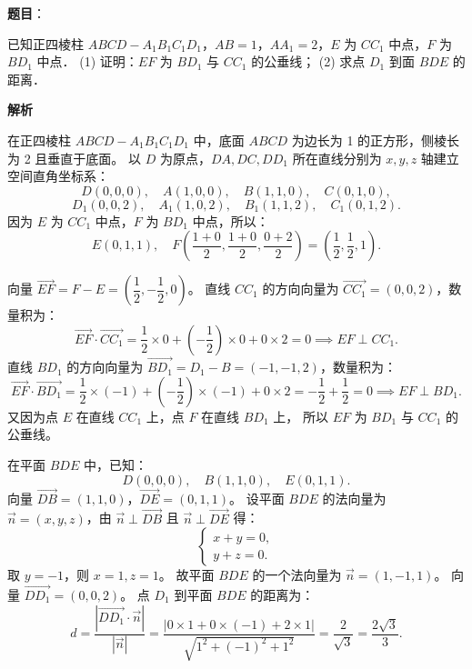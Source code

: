 \begin{answer}

\textbf{题目}：

已知正四棱柱 $ABCD - A_1B_1C_1D_1$，$AB = 1$，$AA_1 = 2$，$E$ 为 $CC_1$ 中点，$F$ 为 $BD_1$ 中点．
(1) 证明：$EF$ 为 $BD_1$ 与 $CC_1$ 的公垂线；
(2) 求点 $D_1$ 到面 $BDE$ 的距离．
\nopagebreak[4]
\begin{center}\end{center}
\nopagebreak[4]
\textbf{解析}
\nopagebreak[4]
\begin{center}\end{center}
\nopagebreak[4]
在正四棱柱 $ABCD - A_1B_1C_1D_1$ 中，底面 $ABCD$ 为边长为 1 的正方形，侧棱长为 2 且垂直于底面。
以 $D$ 为原点，$DA, DC, DD_1$ 所在直线分别为 $x, y, z$ 轴建立空间直角坐标系：
\nopagebreak[4]
\[D(0, 0, 0), \quad A(1, 0, 0), \quad B(1, 1, 0), \quad C(0, 1, 0),\]
\nopagebreak[4]
\[D_1(0, 0, 2), \quad A_1(1, 0, 2), \quad B_1(1, 1, 2), \quad C_1(0, 1, 2).\]
因为 $E$ 为 $CC_1$ 中点，$F$ 为 $BD_1$ 中点，所以：
\nopagebreak[4]
\[E(0, 1, 1), \quad F\left(\frac{1+0}{2}, \frac{1+0}{2}, \frac{0+2}{2}\right) = \left(\frac{1}{2}, \frac{1}{2}, 1\right).\]


向量 $\vec{EF} = F - E = \left(\dfrac{1}{2}, -\dfrac{1}{2}, 0\right)$。
直线 $CC_1$ 的方向向量为 $\vec{CC_1} = (0, 0, 2)$，数量积为：
\nopagebreak[4]
\[\vec{EF} \cdot \vec{CC_1} = \frac{1}{2} \times 0 + \left(-\frac{1}{2}\right) \times 0 + 0 \times 2 = 0 \implies EF \perp CC_1.\]
直线 $BD_1$ 的方向向量为 $\vec{BD_1} = D_1 - B = (-1, -1, 2)$，数量积为：
\nopagebreak[4]
\[\vec{EF} \cdot \vec{BD_1} = \frac{1}{2} \times (-1) + \left(-\frac{1}{2}\right) \times (-1) + 0 \times 2 = -\frac{1}{2} + \frac{1}{2} = 0 \implies EF \perp BD_1.\]
又因为点 $E$ 在直线 $CC_1$ 上，点 $F$ 在直线 $BD_1$ 上，
所以 $EF$ 为 $BD_1$ 与 $CC_1$ 的公垂线。


在平面 $BDE$ 中，已知：
\nopagebreak[4]
\[D(0, 0, 0), \quad B(1, 1, 0), \quad E(0, 1, 1).\]
向量 $\vec{DB} = (1, 1, 0)$，$\vec{DE} = (0, 1, 1)$。
设平面 $BDE$ 的法向量为 $\vec{n} = (x, y, z)$，由 $\vec{n} \perp \vec{DB}$ 且 $\vec{n} \perp \vec{DE}$ 得：
\nopagebreak[4]
\[\begin{cases} x + y = 0, \\ y + z = 0. \end{cases}\]
取 $y = -1$，则 $x = 1, z = 1$。
故平面 $BDE$ 的一个法向量为 $\vec{n} = (1, -1, 1)$。
向量 $\vec{DD_1} = (0, 0, 2)$。
点 $D_1$ 到平面 $BDE$ 的距离为：
\nopagebreak[4]
\[d = \frac{|\vec{DD_1} \cdot \vec{n}|}{|\vec{n}|} = \frac{|0 \times 1 + 0 \times (-1) + 2 \times 1|}{\sqrt{1^2 + (-1)^2 + 1^2}} = \frac{2}{\sqrt{3}} = \frac{2\sqrt{3}}{3}.\]



\end{answer}
